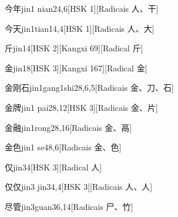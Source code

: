 \begin{entry}{今年}{jin1 nian2}{4,6}[HSK 1][Radicais ⼈、⼲]
\end{entry}

\begin{entry}{今天}{jin1tian1}{4,4}[HSK 1][Radicais ⼈、⼤]
\end{entry}

\begin{entry}{斤}{jin1}{4}[HSK 2][Kangxi 69][Radical ⽄]
\end{entry}

\begin{entry}{金}{jin1}{8}[HSK 3][Kangxi 167][Radical ⾦]
\end{entry}

\begin{entry}{金刚石}{jin1gang1shi2}{8,6,5}[Radicais ⾦、⼑、⽯]
\end{entry}

\begin{entry}{金牌}{jin1 pai2}{8,12}[HSK 3][Radicais ⾦、⽚]
\end{entry}

\begin{entry}{金融}{jin1rong2}{8,16}[Radicais ⾦、⿀]
\end{entry}

\begin{entry}{金色}{jin1 se4}{8,6}[Radicais ⾦、⾊]
\end{entry}

\begin{entry}{仅}{jin3}{4}[HSK 3][Radical ⼈]
\end{entry}

\begin{entry}{仅仅}{jin3 jin3}{4,4}[HSK 3][Radicais ⼈、⼈]
\end{entry}

\begin{entry}{尽管}{jin3guan3}{6,14}[Radicais ⼫、⽵]
\end{entry}

